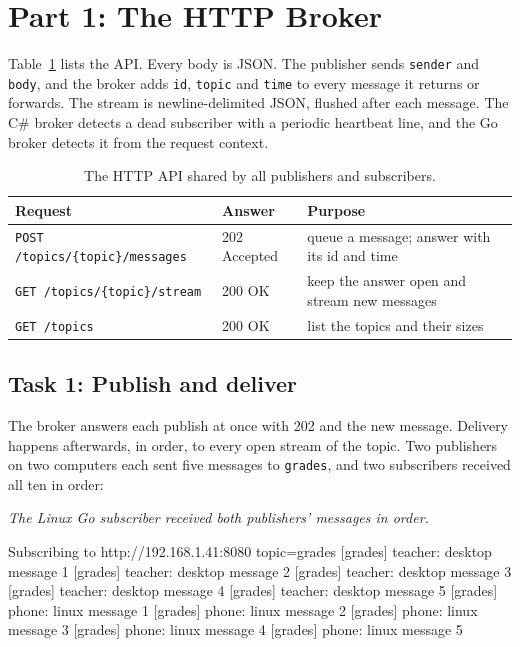 \documentclass[12pt,a4paper]{article}
\begin{document}
\section{Part 1: The HTTP Broker}
Table~\ref{tab:http-api} lists the API. Every body is JSON. The publisher sends
\texttt{sender} and \texttt{body}, and the broker adds \texttt{id}, \texttt{topic}
and \texttt{time} to every message it returns or forwards. The stream is
newline-delimited JSON, flushed after each message. The C\# broker detects a dead
subscriber with a periodic heartbeat line, and the Go broker detects it from the
request context.

\begin{table}[H]
\centering
\small
\begin{tabularx}{\textwidth}{@{}l l X@{}}
\toprule
\textbf{Request} & \textbf{Answer} & \textbf{Purpose} \\
\midrule
\texttt{POST /topics/\{topic\}/messages} & 202 Accepted & queue a message; answer with its id and time \\
\texttt{GET /topics/\{topic\}/stream} & 200 OK & keep the answer open and stream new messages \\
\texttt{GET /topics} & 200 OK & list the topics and their sizes \\
\bottomrule
\end{tabularx}
\caption{The HTTP API shared by all publishers and subscribers.}
\label{tab:http-api}
\end{table}

\subsection{Task 1: Publish and deliver}
The broker answers each publish at once with 202 and the new message. Delivery
happens afterwards, in order, to every open stream of the topic. Two publishers
on two computers each sent five messages to \texttt{grades}, and two subscribers
received all ten in order:

\par\medskip\noindent\textit{The Linux Go subscriber received both publishers' messages in order.}\par\nopagebreak
\begin{terminalwindow}[]
Subscribing to http://192.168.1.41:8080 topic=grades
[grades] teacher: desktop message 1
[grades] teacher: desktop message 2
[grades] teacher: desktop message 3
[grades] teacher: desktop message 4
[grades] teacher: desktop message 5
[grades] phone: linux message 1
[grades] phone: linux message 2
[grades] phone: linux message 3
[grades] phone: linux message 4
[grades] phone: linux message 5
\end{terminalwindow}
\end{document}
